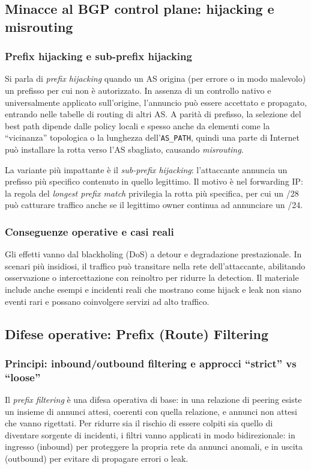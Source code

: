 \subsection{Minacce al BGP control plane: hijacking e misrouting}

\subsubsection{Prefix hijacking e sub-prefix hijacking}
Si parla di \emph{prefix hijacking} quando un AS origina (per errore o in modo malevolo) un prefisso per cui non è autorizzato. In assenza di un controllo nativo e universalmente applicato sull’origine, l’annuncio può essere accettato e propagato, entrando nelle tabelle di routing di altri AS. A parità di prefisso, la selezione del best path dipende dalle policy locali e spesso anche da elementi come la “vicinanza” topologica o la lunghezza dell’\texttt{AS\_PATH}, quindi una parte di Internet può installare la rotta verso l’AS sbagliato, causando \emph{misrouting}.

La variante più impattante è il \emph{sub-prefix hijacking}: l’attaccante annuncia un prefisso più specifico contenuto in quello legittimo. Il motivo è nel forwarding IP: la regola del \emph{longest prefix match} privilegia la rotta più specifica, per cui un /28 può catturare traffico anche se il legittimo owner continua ad annunciare un /24.

\subsubsection{Conseguenze operative e casi reali}
Gli effetti vanno dal blackholing (DoS) a detour e degradazione prestazionale. In scenari più insidiosi, il traffico può transitare nella rete dell’attaccante, abilitando osservazione o intercettazione con reinoltro per ridurre la detection. Il materiale include anche esempi e incidenti reali che mostrano come hijack e leak non siano eventi rari e possano coinvolgere servizi ad alto traffico.

\subsection{Difese operative: Prefix (Route) Filtering}

\subsubsection{Principi: inbound/outbound filtering e approcci ``strict'' vs ``loose''}
Il \emph{prefix filtering} è una difesa operativa di base: in una relazione di peering esiste un insieme di annunci attesi, coerenti con quella relazione, e annunci non attesi che vanno rigettati. Per ridurre sia il rischio di essere colpiti sia quello di diventare sorgente di incidenti, i filtri vanno applicati in modo bidirezionale: in ingresso (inbound) per proteggere la propria rete da annunci anomali, e in uscita (outbound) per evitare di propagare errori o leak.

